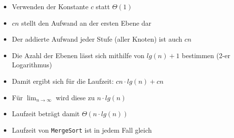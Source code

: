 \documentclass[
    12pt,
    a4paper,
    ngerman,
    color=3b,%
    marginpar=false,
    colorback=false,
    leqno,
]{tudaexercise}
\begin{document}
\begin{itemize}
\begin{itemize}
\begin{itemize}
                        \item Verwenden der Konstante $c$ statt $\Theta(1)$
                        \item $cn$ stellt den Aufwand an der ersten Ebene dar
                        \item Der addierte Aufwand jeder Stufe (aller Knoten) ist auch $cn$
                        \item Die Azahl der Ebenen lässt sich mithilfe von $lg(n) + 1$ bestimmen (2-er Logarithmus)
                        \item Damit ergibt sich für die Laufzeit: $cn \cdot lg(n)+cn$
                        \item Für $\lim_{n \rightarrow \infty}$ wird diese zu $n \cdot lg(n)$
                        \item Laufzeit beträgt damit $\Theta(n \cdot lg(n))$
                        \item Laufzeit von \texttt{MergeSort} ist in jedem Fall gleich
                    \end{itemize}

          \end{itemize}
\end{itemize}
\clearpage
\end{document}
